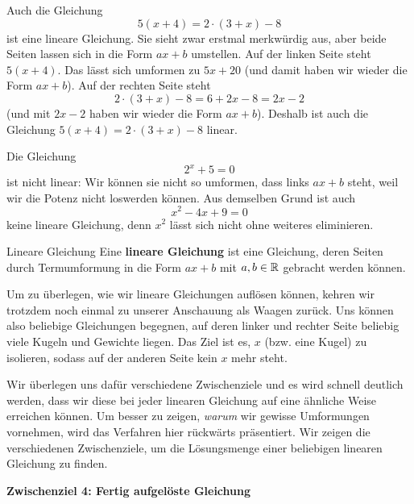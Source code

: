 \documentclass[../../main.tex]{subfiles}
\begin{document}
\begin{example}{}
    Auch die Gleichung 
    \[5(x+4)=2\cdot (3+x)-8\] 
    ist eine lineare Gleichung. Sie sieht zwar erstmal merkwürdig aus, aber beide Seiten lassen sich in die Form $ax+b$ umstellen. Auf der linken Seite steht $5(x+4)$. Das lässt sich umformen zu $5x+20$ (und damit haben wir wieder die Form $ax+b$). Auf der rechten Seite steht 
    \[2\cdot (3+x)-8=6+2x-8=2x-2\] 
    (und mit $2x-2$ haben wir wieder die Form $ax+b$). Deshalb ist auch die Gleichung $5(x+4)=2\cdot (3+x)-8$ linear.
\end{example}

\begin{example}{}
    Die Gleichung 
    \[2^x+5=0\] 
    ist nicht linear: Wir können sie nicht so umformen, dass links $ax+b$ steht, weil wir die Potenz nicht loswerden können. Aus demselben Grund ist auch 
    \[x^2-4x+9=0\] 
    keine lineare Gleichung, denn $x^2$ lässt sich nicht ohne weiteres eliminieren.
\end{example}

\begin{definition}{Lineare Gleichung}
    Eine \textbf{lineare Gleichung} ist eine Gleichung, deren Seiten durch Termumformung in die Form $ax+b$ mit $a,b\in\mathbb{R}$ gebracht werden können.
\end{definition}

Um zu überlegen, wie wir lineare Gleichungen auflösen können, kehren wir trotzdem noch einmal zu unserer Anschauung als Waagen zurück. 
Uns können also beliebige Gleichungen begegnen, auf deren linker und rechter Seite beliebig viele Kugeln und Gewichte liegen. Das Ziel 
ist es, $x$ (bzw. eine Kugel) zu isolieren, sodass auf der anderen Seite kein $x$ mehr steht.

Wir überlegen uns dafür verschiedene Zwischenziele und es wird schnell deutlich werden, dass wir diese bei jeder linearen Gleichung 
auf eine ähnliche Weise erreichen können. Um besser zu zeigen, \emph{warum} wir gewisse Umformungen vornehmen, wird das Verfahren 
hier rückwärts präsentiert. Wir zeigen die verschiedenen Zwischenziele, um die Lösungsmenge einer beliebigen linearen Gleichung zu finden.

\textbf{Zwischenziel 4: Fertig aufgelöste Gleichung}
\end{document}
